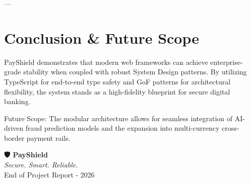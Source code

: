 \documentclass[11pt,a4paper]{article}
\begin{document}
---

\section{Conclusion \& Future Scope}
PayShield demonstrates that modern web frameworks can achieve enterprise-grade stability when coupled with robust System Design patterns. By utilizing TypeScript for end-to-end type safety and GoF patterns for architectural flexibility, the system stands as a high-fidelity blueprint for secure digital banking.

Future Scope: The modular architecture allows for seamless integration of AI-driven fraud prediction models and the expansion into multi-currency cross-border payment rails.

\newpage
\begin{center}
    \Huge \textbf{🛡️ PayShield} \\
    \large \textit{Secure. Smart. Reliable.} \\
    \vspace{0.5cm}
    \small \color{secondary} End of Project Report - 2026
\end{center}
\end{document}

